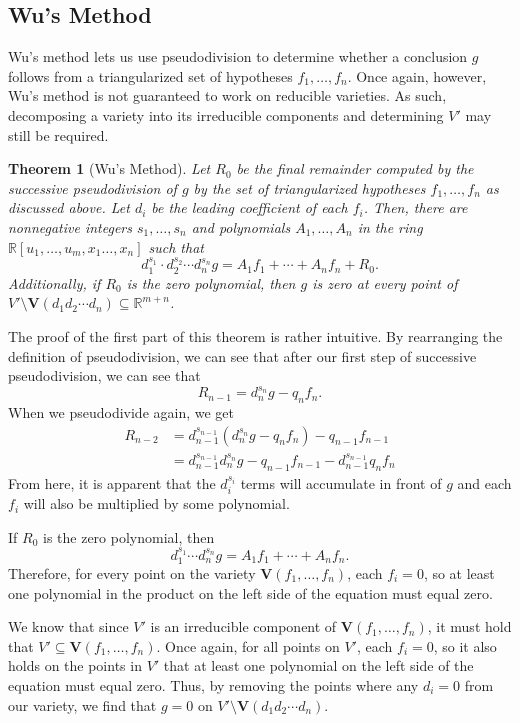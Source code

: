 \documentclass[12pt]{article}
\theoremstyle{plain}
\newtheorem{Theorem}{Theorem}
\theoremstyle{definition}
\theoremstyle{remark}
\begin{document}
\subsection{Wu's Method}
Wu's method lets us use pseudodivision to determine whether a conclusion $g$ follows from a triangularized set of hypotheses $f_1,\dots,f_n$.
Once again, however, Wu's method is not guaranteed to work on reducible varieties. As such, decomposing a variety into its irreducible components and determining $V'$ may still be required.
\pagebreak
\begin{Theorem}[Wu's Method]
    Let $R_0$ be the final remainder computed by the successive pseudodivision of $g$ by the set of triangularized hypotheses $f_1,\dots,f_n$ as discussed above.
    Let $d_i$ be the leading coefficient of each $f_i$. 
    Then, there are nonnegative integers $s_1,\dots,s_n$ and polynomials $A_1,\dots,A_n$ in the ring $\mathbb{R}[u_1,\dots,u_m,x_1\dots,x_n]$ such that
    $$d_{1}^{s_1}\cdot d_2^{s_2} \cdots d_n^{s_n} g = A_1 f_1 + \cdots + A_n f_n + R_0.$$
    Additionally, if $R_0$ is the zero polynomial, then $g$ is zero at every point of $V' \setminus \textbf{V}(d_1d_2\cdots d_n) \subseteq \mathbb{R}^{m+n}$.
\end{Theorem}
The proof of the first part of this theorem is rather intuitive. 
By rearranging the definition of pseudodivision, we can see that after our first step of successive pseudodivision, we can see that $$R_{n-1} = d_n^{s_n} g - q_nf_n.$$
When we pseudodivide again, we get
\begin{align*}
    R_{n-2} & = d_{n-1}^{s_{n-1}}(d_n^{s_n} g - q_nf_n) - q_{n-1}f_{n-1}\\
            & = d_{n-1}^{s_{n-1}}d_n^{s_n} g - q_{n-1}f_{n-1} - d_{n-1}^{s_{n-1}}q_nf_n 
\end{align*}
From here, it is apparent that the $d_i^{s_i}$ terms will accumulate in front of $g$ and each $f_i$ will also be multiplied by some polynomial.

If $R_0$ is the zero polynomial, then $$d_{1}^{s_1} \cdots d_n^{s_n} g = A_1 f_1 + \cdots + A_n f_n.$$
Therefore, for every point on the variety $\textbf{V}(f_1,\dots,f_n)$, each $f_i = 0$, so at least one polynomial in the product on the left side of the equation must equal zero. 

We know that since $V'$ is an irreducible component of $\textbf{V}(f_1,\dots,f_n)$, it must hold that $V' \subseteq \textbf{V}(f_1,\dots,f_n)$.
Once again, for all points on $V'$, each $f_i = 0$, so it also holds on the points in $V'$ that at least one polynomial on the left side of the equation must equal zero.  
Thus, by removing the points where any $d_i = 0$ from our variety, we find that $g = 0$ on $V' \setminus \textbf{V}(d_1d_2\cdots d_n)$. 
\end{document}
